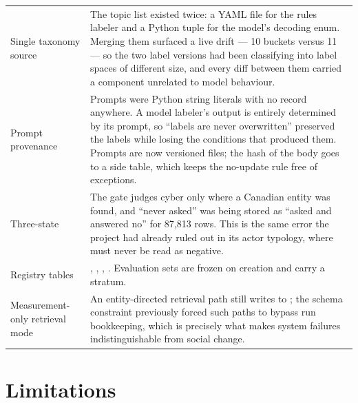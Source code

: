 \documentclass[11pt]{article}
\begin{document}
\begin{center}
\begin{tabularx}{\linewidth}{@{}p{3.5cm}L@{}}
\toprule
{} &  \\
\midrule
Single taxonomy source & The topic list existed twice: a YAML file for the
rules labeler and a Python tuple for the model's decoding enum. Merging them
surfaced a live drift --- 10 buckets versus 11 --- so the two label versions
had been classifying into label spaces of different size, and every diff
between them carried a component unrelated to model behaviour. \\
Prompt provenance & Prompts were Python string literals with no record
anywhere. A model labeler's output is entirely determined by its prompt, so
``labels are never overwritten'' preserved the labels while losing the
conditions that produced them. Prompts are now versioned files; the hash of the
body goes to a side table, which keeps the no-update rule free of exceptions. \\
Three-state  & The gate judges cyber only where a Canadian
entity was found, and ``never asked'' was being stored as ``asked and
answered no'' for 87{,}813 rows. This is the same error the project had
already ruled out in its actor typology, where  must never
be read as negative. \\
Registry tables & , ,
, . Evaluation sets are frozen on
creation and carry a stratum. \\
Measurement-only retrieval mode & An entity-directed retrieval path still writes to
; the schema constraint previously forced such paths to
bypass run bookkeeping, which is precisely what makes system failures
indistinguishable from social change. \\
\bottomrule
\end{tabularx}
\end{center}

\section{Limitations}
\end{document}
